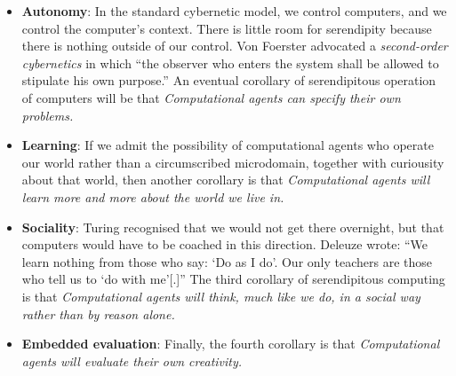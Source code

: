 \begin{itemize}
\item \textbf{Autonomy}: In the standard cybernetic model, we control computers, and we control the computer's context.  There is little room for serendipity because there is nothing outside of our control. Von Foerster \citeyear[p. 286]{von2003cybernetics} advocated a \emph{second-order cybernetics} in which ``the observer who enters the system shall be allowed to stipulate his own purpose.'' An eventual corollary of serendipitous operation of computers will be that \emph{Computational agents can specify their own problems.}
\item \textbf{Learning}: If we admit the possibility of computational agents who operate our world rather than a circumscribed microdomain, together with curiousity about that world, then another corollary is that \emph{Computational agents will learn more and more about the world we live in.}
\item \textbf{Sociality}: Turing recognised that we would not get there overnight, but that computers would have to be coached in this direction.  Deleuze \citeyear[p. 26]{deleuze1994difference} wrote: ``We learn nothing from those who say: `Do as I do'. Our only teachers are those who tell us to `do with me'[.]'' The third corollary of serendipitous computing is that \emph{Computational agents will think, much like we do, in a social way rather than by reason alone.}
\item \textbf{Embedded evaluation}: Finally, the fourth corollary is that \emph{Computational agents will evaluate their own creativity.}
\end{itemize}


